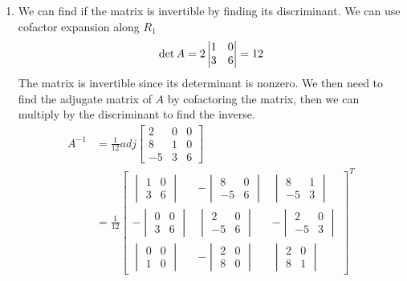 \documentclass[11pt, letterpaper, twoside]{article}
\begin{document}
\begin{enumerate}
\begin{enumerate}[label=(\alph*)]
\item %
We can find if the matrix is invertible by finding its discriminant. We can use cofactor expansion along $R_1$
$$\det A=2\begin{vmatrix}
1 & 0\\
3 & 6
\end{vmatrix}=12\\$$
The matrix is invertible since its determinant is nonzero. We then need to find the adjugate matrix of $A$ by cofactoring the matrix, then we can multiply by the discriminant to find the inverse.
\begin{align*}
A^{-1}&=\frac{1}{12}adj \begin{bmatrix}
2 & 0 & 0\\
8 & 1 & 0\\
-5 & 3 & 6
\end{bmatrix}\\
&=\frac{1}{12}\begin{bmatrix}
\begin{vmatrix}
1 & 0\\
3 & 6
\end{vmatrix}&
-\begin{vmatrix}
8 & 0\\
-5 & 6
\end{vmatrix}&
\begin{vmatrix}
8 & 1\\
-5 & 3
\end{vmatrix}\\
-\begin{vmatrix}
0 & 0\\
3 & 6
\end{vmatrix}&\begin{vmatrix}
2 & 0\\
-5 & 6
\end{vmatrix}&
-\begin{vmatrix}
2 & 0\\
-5 & 3
\end{vmatrix}\\
\begin{vmatrix}
0 & 0\\
1 & 0
\end{vmatrix}&-\begin{vmatrix}
2 & 0\\
8 & 0
\end{vmatrix}&\begin{vmatrix}
2 & 0\\
8 & 1
\end{vmatrix}
\end{bmatrix}^T\\

\end{align*}
\end{enumerate}
\end{enumerate}
\end{document}
